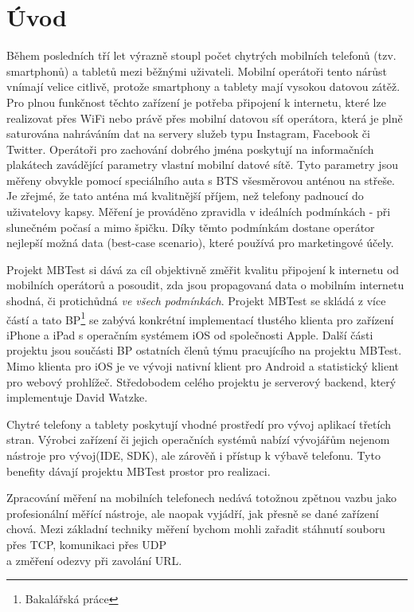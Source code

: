 \chapter{Úvod}
Během posledních tří let výrazně stoupl počet chytrých mobilních telefonů (tzv. smartphonů) a tabletů mezi běžnými uživateli. Mobilní operátoři tento nárůst vnímají velice citlivě, protože smartphony a tablety mají vysokou datovou zátěž. Pro plnou funkčnost těchto zařízení je potřeba připojení k internetu, které lze realizovat přes WiFi nebo právě přes mobilní datovou síť operátora, která je plně saturována nahráváním dat na servery služeb typu Instagram, Facebook či Twitter. Operátoři pro zachování dobrého jména poskytují na informačních plakátech zavádějící parametry vlastní mobilní datové sítě. Tyto parametry jsou měřeny obvykle pomocí speciálního auta s BTS všesměrovou anténou na střeše. Je zřejmé, že tato anténa má kvalitnější příjem, než telefony padnoucí do uživatelovy kapsy. Měření je prováděno zpravidla v ideálních podmínkách - při slunečném počasí a mimo špičku. Díky těmto podmínkám dostane operátor nejlepší možná data (best-case scenario), které používá pro marketingové účely.

Projekt MBTest si dává za cíl objektivně změřit kvalitu připojení k internetu od mobilních operátorů a posoudit, zda jsou propagovaná data o mobilním internetu shodná, či protichůdná \emph{ve všech podmínkách}. Projekt MBTest se skládá z více částí a tato BP\footnote{Bakalářská práce} se zabývá konkrétní implementací tlustého klienta pro zařízení iPhone a iPad s operačním systémem iOS od společnosti Apple. Další části projektu jsou součásti BP ostatních členů týmu pracujícího na projektu MBTest. Mimo klienta pro iOS je ve vývoji nativní klient pro Android a statistický klient pro webový prohlížeč. Středobodem celého projektu je serverový backend, který implementuje David Watzke.

Chytré telefony a tablety poskytují vhodné prostředí pro vývoj aplikací třetích stran. Výrobci zařízení či jejich operačních systémů nabízí vývojářům nejenom nástroje pro vývoj(IDE, SDK), ale zárověň i přístup k výbavě telefonu. Tyto benefity dávají projektu MBTest prostor pro realizaci.

Zpracování měření na mobilních telefonech nedává totožnou zpětnou vazbu jako profesionální měřící nástroje, ale naopak vyjádří, jak přesně se dané zařízení chová. Mezi základní techniky měření bychom mohli zařadit stáhnutí souboru přes TCP, komunikaci přes UDP \\a změření odezvy při zavolání URL.